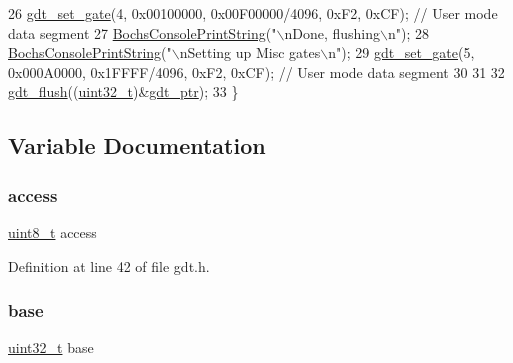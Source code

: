 \begin{DoxyCode}
26     \hyperlink{a00101_abcf0775ea602ace125ae809475b6d8bf_abcf0775ea602ace125ae809475b6d8bf}{gdt\_set\_gate}(4, 0x00100000, 0x00F00000/4096, 0xF2, 0xCF); \textcolor{comment}{// User mode data segment}
27     \hyperlink{a00077_a19e1f554d03c977f8b947f21489daa41_a19e1f554d03c977f8b947f21489daa41}{BochsConsolePrintString}(\textcolor{stringliteral}{"\(\backslash\)nDone, flushing\(\backslash\)n"});
28     \hyperlink{a00077_a19e1f554d03c977f8b947f21489daa41_a19e1f554d03c977f8b947f21489daa41}{BochsConsolePrintString}(\textcolor{stringliteral}{"\(\backslash\)nSetting up Misc gates\(\backslash\)n"});
29     \hyperlink{a00101_abcf0775ea602ace125ae809475b6d8bf_abcf0775ea602ace125ae809475b6d8bf}{gdt\_set\_gate}(5, 0x000A0000, 0x1FFFF/4096, 0xF2, 0xCF); \textcolor{comment}{// User mode data segment}
30 
31 
32     \hyperlink{a00104_a62397fecbde23244b570ae632fe926fa_a62397fecbde23244b570ae632fe926fa}{gdt\_flush}((\hyperlink{a00140_a435d1572bf3f880d55459d9805097f62_a435d1572bf3f880d55459d9805097f62}{uint32\_t})&\hyperlink{a00104_ab0888c07dfb9352ef76d05e63464cf0b_ab0888c07dfb9352ef76d05e63464cf0b}{gdt\_ptr});
33 \}
\end{DoxyCode}


\subsection{Variable Documentation}
\mbox{\label{a00104_a8b0d6200bc639dd37ff68847a0adde5f_a8b0d6200bc639dd37ff68847a0adde5f}} 
\subsubsection{\texorpdfstring{access}{access}}
{\footnotesize\ttfamily \hyperlink{a00140_aba7bc1797add20fe3efdf37ced1182c5_aba7bc1797add20fe3efdf37ced1182c5}{uint8\+\_\+t} access}



Definition at line 42 of file gdt.\+h.

\mbox{\label{a00104_a0523cedff47e2441fc198b7770ec5d3f_a0523cedff47e2441fc198b7770ec5d3f}} 
\subsubsection{\texorpdfstring{base}{base}}
{\footnotesize\ttfamily \hyperlink{a00140_a435d1572bf3f880d55459d9805097f62_a435d1572bf3f880d55459d9805097f62}{uint32\+\_\+t} base}



